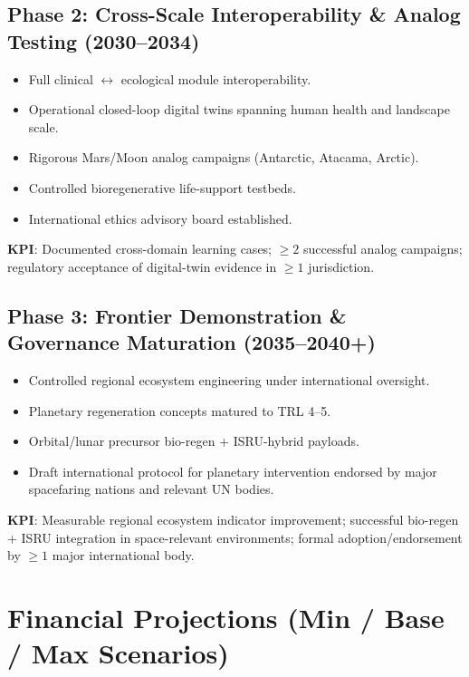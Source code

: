 \documentclass[11pt,a4paper]{article}
\begin{document}
\subsection{Phase 2: Cross-Scale Interoperability \& Analog Testing (2030--2034)}
\begin{itemize}
    \item Full clinical $\leftrightarrow$ ecological module interoperability.
    \item Operational closed-loop digital twins spanning human health and landscape scale.
    \item Rigorous Mars/Moon analog campaigns (Antarctic, Atacama, Arctic).
    \item Controlled bioregenerative life-support testbeds.
    \item International ethics advisory board established.
\end{itemize}
\textbf{KPI}: Documented cross-domain learning cases; $\geq 2$ successful analog campaigns; regulatory acceptance of digital-twin evidence in $\geq 1$ jurisdiction.

\subsection{Phase 3: Frontier Demonstration \& Governance Maturation (2035--2040+)}
\begin{itemize}
    \item Controlled regional ecosystem engineering under international oversight.
    \item Planetary regeneration concepts matured to TRL 4--5.
    \item Orbital/lunar precursor bio-regen + ISRU-hybrid payloads.
    \item Draft international protocol for planetary intervention endorsed by major spacefaring nations and relevant UN bodies.
\end{itemize}
\textbf{KPI}: Measurable regional ecosystem indicator improvement; successful bio-regen + ISRU integration in space-relevant environments; formal adoption/endorsement by $\geq 1$ major international body.

\section{Financial Projections (Min / Base / Max Scenarios)}
\end{document}
